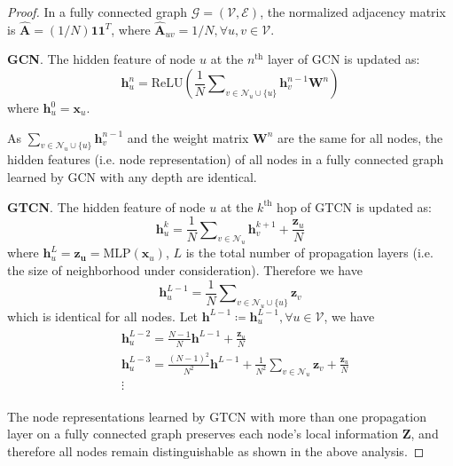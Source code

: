 \documentclass[lettersize,journal]{IEEEtran}
\theoremstyle{plain}
\theoremstyle{definition}
\theoremstyle{remark}
\begin{document}
\begin{proof}
	In a fully connected graph $\mathcal{G} = (\mathcal{V}, \mathcal{E})$, the normalized adjacency matrix is $\hat{\bm{A}} = (1/N)\mathbf{1}\mathbf{1}^T$, where $\hat{\bm{A}}_{uv} = 1/N, \forall u,v \in \mathcal{V}$.
	
	\textbf{GCN}. The hidden feature of node $u$ at the $n^\text{th}$ layer of GCN is updated as:
	\begin{equation}
		\label{eqn:GCN_eg}
		\bm{h}_u^n = \text{ReLU}\left(\frac{1}{N}\sum\nolimits_{v\in \mathcal{N}_u \cup \{u\}}{\bm{h}_v^{n-1} \bm{W}^n }\right)
	\end{equation}
	where $\bm{h}_u^0 = \bm{x}_u$.
	
	As $\sum\nolimits_{v\in \mathcal{N}_u \cup \{u\}}{\bm{h}_v^{n-1}}$ and the weight matrix $\bm{W}^n$ are the same for all nodes, the hidden features (i.e. node representation) of all nodes in a fully connected graph learned by GCN with any depth are identical.
	
	\textbf{GTCN}. The hidden feature of node $u$ at the $k^\text{th}$ hop of GTCN is updated as:
	\begin{equation}
		\label{eqn:gtcn_eg}
		\bm{h}_u^k = \frac{1}{N}\sum\nolimits_{v\in \mathcal{N}_u}{\bm{h}_v^{k+1}} + \frac{\bm{z}_u}{N}
	\end{equation}
	where $\bm{h}_u^L = \bm{z_u} = \text{MLP}(\bm{x}_u)$, $L$ is the total number of propagation layers (i.e. the size of neighborhood under consideration). Therefore we have
	\begin{equation*}
		\bm{h}_u^{L-1} = \frac{1}{N}\sum\nolimits_{v\in \mathcal{N}_u \cup \{u\}} \bm{z}_v
	\end{equation*}
	which is identical for all nodes. Let $\bm{h}^{L-1} \coloneqq \bm{h}_u^{L-1}, \forall u \in \mathcal{V}$, we have
	\begin{align*}
		\begin{split}
&\bm{h}_u^{L-2}= \frac{N-1}{N} \bm{h}^{L-1} + \frac{\bm{z}_u}{N} \\
			&\bm{h}_u^{L-3}= \frac{(N-1)^2}{N^2} \bm{h}^{L-1} + \frac{1}{N^2}\sum\nolimits_{v\in \mathcal{N}_u}{\bm{z}_v} + \frac{\bm{z}_u}{N} \\
			&\vdots
		\end{split}
	\end{align*}

	The node representations learned by GTCN with more than one propagation layer on a fully connected graph preserves each node's local information $\bm{Z}$, and therefore all nodes remain distinguishable as shown in the above analysis.
\end{proof}
\end{document}
